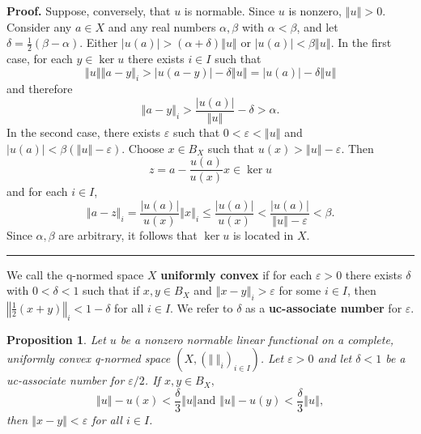 \documentclass[11pt]{article}%
\newtheorem{proposition}[theorem]{Proposition}
\newenvironment{proof}[1][Proof]{\noindent\textbf{#1.} }{\ \rule{0.5em}{0.5em}}
\begin{document}
\begin{proof}
Suppose, conversely, that $u$ is normable. Since $u$ is nonzero, $\left\Vert
u\right\Vert >0$. Consider any $a\in X$ and any real numbers $\alpha,\beta$
with $\alpha<\beta$, and let $\delta=\frac{1}{2}(\beta-\alpha)$. Either
$\left\vert u(a)\right\vert >(\alpha+\delta)\left\Vert u\right\Vert $ or
$\left\vert u(a)\right\vert <\beta\left\Vert u\right\Vert $. In the first
case, for each $y\in\ker u$ there exists $i\in I$ such that%
\[
\left\Vert u\right\Vert \left\Vert a-y\right\Vert _{i}>\left\vert
u(a-y)\right\vert -\delta\left\Vert u\right\Vert =\left\vert u(a)\right\vert
-\delta\left\Vert u\right\Vert
\]
and therefore%
\[
\left\Vert a-y\right\Vert _{i}>\frac{\left\vert u(a)\right\vert }{\left\Vert
u\right\Vert }-\delta>\alpha.
\]
In the second case, there exists $\varepsilon$ such that $0<\varepsilon
<\left\Vert u\right\Vert $ and $\left\vert u(a)\right\vert <\beta\left(
\left\Vert u\right\Vert -\varepsilon\right)  $. Choose $x\in B_{X}$ such that
$u(x)>\left\Vert u\right\Vert -\varepsilon$. Then%
\[
z=a-\frac{u(a)}{u(x)}x\in\ker u
\]
and for each $i\in I$,%
\[
\left\Vert a-z\right\Vert _{i}=\frac{\left\vert u(a)\right\vert }%
{u(x)}\left\Vert x\right\Vert _{i}\leq\frac{\left\vert u(a)\right\vert }%
{u(x)}<\frac{\left\vert u(a)\right\vert }{\left\Vert u\right\Vert
-\varepsilon}<\beta.
\]
Since $\alpha,\beta$ are arbitrary, it follows that $\ker u$ is located in $X$.
\end{proof}

%

\medskip


We call the q-normed space $X$ \textbf{uniformly convex }if for each
$\varepsilon>0$ there exists $\delta$ with $0<\delta<1$ such that if $x,y\in
B_{X}$ and $\left\Vert x-y\right\Vert _{i}>\varepsilon$ for some $i\in I$,
then $\left\Vert \frac{1}{2}\left(  x+y\right)  \right\Vert _{i}<1-\delta$ for
all $i\in I$. We refer to $\delta$ as a \textbf{uc-associate number} for
$\varepsilon$.

\begin{proposition}
\label{feb28p2}Let $u$ be a nonzero normable linear functional on a complete,
uniformly convex q-normed space $\left(  X,\left(  \left\Vert \ \right\Vert
_{i}\right)  _{i\in I}\right)  $. Let $\varepsilon>0$ and let $\delta<1$ be a
uc-associate number for $\varepsilon/2$. If $x,y\in B_{X},$%
\begin{equation}
\left\Vert u\right\Vert -u(x)<\frac{\delta}{3}\left\Vert u\right\Vert \text{
and }\left\Vert u\right\Vert -u(y)<\frac{\delta}{3}\left\Vert u\right\Vert ,
\label{6a1}%
\end{equation}
then $\left\Vert x-y\right\Vert <\varepsilon$ for all $i\in I$.
\end{proposition}
\end{document}
